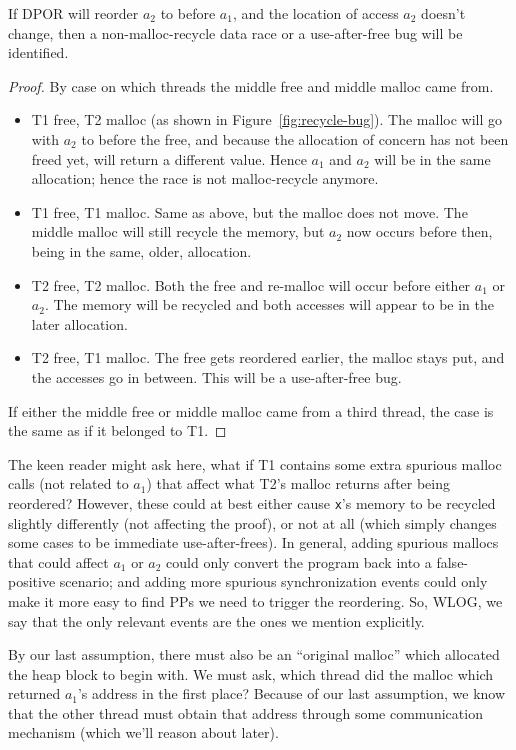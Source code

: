 \begin{lemma}
	If DPOR will reorder $a_2$ to before $a_1$, and the location of access $a_2$ doesn't change,
	then a non-malloc-recycle data race or a use-after-free bug will be identified.
	\label{lem:reorder}
\end{lemma}
\begin{proof}
By case on which threads the middle free and middle malloc came from.
\begin{itemize}
	\item T1 free, T2 malloc (as shown in Figure~\ref{fig:recycle-bug}). The malloc will go with $a_2$ to before the free, and because the allocation of concern has not been freed yet, will return a different value. Hence $a_1$ and $a_2$ will be in the same allocation; hence the race is not malloc-recycle anymore.
	\item T1 free, T1 malloc. Same as above, but the malloc does not move. The middle malloc will still recycle the memory, but $a_2$ now occurs before then, being in the same, older, allocation.
	\item T2 free, T2 malloc. Both the free and re-malloc will occur before either $a_1$ or $a_2$. The memory will be recycled and both accesses will appear to be in the later allocation.
	\item T2 free, T1 malloc. The free gets reordered earlier, the malloc stays put, and the accesses go in between. This will be a use-after-free bug.
\end{itemize}
If either the middle free or middle malloc came from a third thread, the case is the same as if it belonged to T1.
\end{proof}

The keen reader might ask here, what if T1 contains some extra spurious malloc calls (not related to $a_1$) that affect what T2's malloc returns after being reordered?
However, these could at best either cause {\tt x}'s memory to be recycled slightly differently (not affecting the proof), or not at all (which simply changes some cases to be immediate use-after-frees).
In general, adding spurious mallocs that could affect $a_1$ or $a_2$ could only convert the program back into a false-positive scenario;
and adding more spurious synchronization events could only make it more easy to find PPs we need to trigger the reordering.
So, WLOG, we say that the only relevant events are the ones we mention explicitly.

By our last assumption, there must also be an ``original malloc'' which allocated the heap block to begin with.
We must ask, which thread did the malloc which returned $a_1$'s address in the first place?
Because of our last assumption, we know that the other thread must obtain that address through some communication mechanism (which we'll reason about later).

